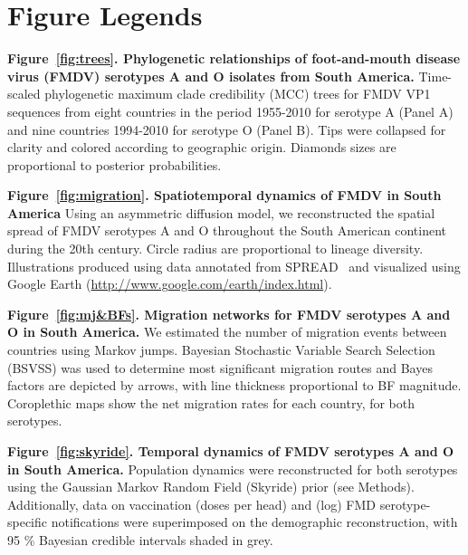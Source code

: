 \documentclass[10pt]{article}
\begin{document}
\newpage

\newpage
\section*{Figure Legends}
{\bf Figure~\ref{fig:trees}. Phylogenetic relationships of foot-and-mouth disease virus (FMDV) serotypes A and O isolates from South America.} Time-scaled phylogenetic maximum clade credibility (MCC) trees for FMDV VP1 sequences from eight countries in the period 1955-2010 for serotype A (Panel A) and nine countries 1994-2010 for serotype O (Panel B).
Tips were collapsed for clarity and colored according to geographic origin.
Diamonds sizes are proportional to posterior probabilities.

{\bf Figure~\ref{fig:migration}. Spatiotemporal dynamics of FMDV in South America} Using an asymmetric diffusion model, we reconstructed the spatial spread of FMDV serotypes A and O throughout the South American continent during the 20th century.
Circle radius are proportional to lineage diversity.
Illustrations produced using data annotated from SPREAD~\cite{spread} and visualized using Google Earth (\url{http://www.google.com/earth/index.html}).

{\bf Figure~\ref{fig:mj&BFs}. Migration networks for FMDV serotypes A and O in South America.} We estimated the number of migration events between countries using Markov jumps.
Bayesian Stochastic Variable Search Selection (BSVSS) was used to determine most significant migration routes and Bayes factors are depicted by arrows, with line thickness proportional to BF magnitude.
Coroplethic maps show the net migration rates for each country, for both serotypes.

{\bf Figure~\ref{fig:skyride}. Temporal dynamics of FMDV serotypes A and O in South America.} Population dynamics were reconstructed for both serotypes using the Gaussian Markov Random Field (Skyride) prior (see Methods).
Additionally, data on vaccination  (doses per head) and (log) FMD serotype-specific notifications were superimposed on the demographic reconstruction, with 95 \% Bayesian credible intervals shaded in grey.

\newpage
\end{document}
